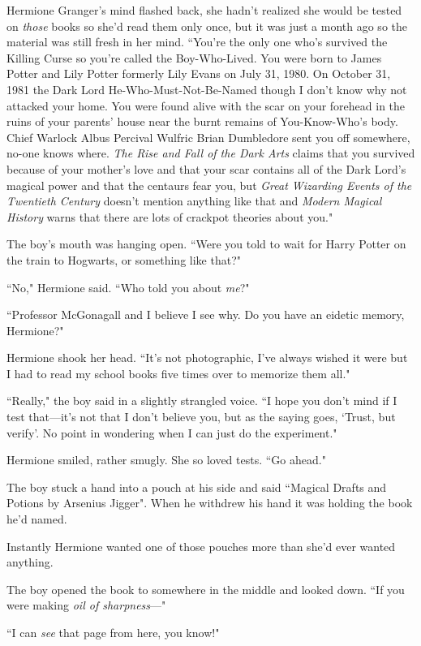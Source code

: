 Hermione Granger's mind flashed back, she hadn't realized she would be tested on \emph{those} books so she'd read them only once, but it was just a month ago so the material was still fresh in her mind. ``You're the only one who's survived the Killing Curse so you're called the Boy-Who-Lived. You were born to James Potter and Lily Potter formerly Lily Evans on July 31, 1980. On October 31, 1981 the Dark Lord He-Who-Must-Not-Be-Named though I don't know why not attacked your home. You were found alive with the scar on your forehead in the ruins of your parents' house near the burnt remains of You-Know-Who's body. Chief Warlock Albus Percival Wulfric Brian Dumbledore sent you off somewhere, no-one knows where. \emph{The Rise and Fall of the Dark Arts} claims that you survived because of your mother's love and that your scar contains all of the Dark Lord's magical power and that the centaurs fear you, but \emph{Great Wizarding Events of the Twentieth Century} doesn't mention anything like that and \emph{Modern Magical History} warns that there are lots of crackpot theories about you."

The boy's mouth was hanging open. ``Were you told to wait for Harry Potter on the train to Hogwarts, or something like that?"

``No," Hermione said. ``Who told you about \emph{me}?"

``Professor McGonagall and I believe I see why. Do you have an eidetic memory, Hermione?"

Hermione shook her head. ``It's not photographic, I've always wished it were but I had to read my school books five times over to memorize them all."

``Really," the boy said in a slightly strangled voice. ``I hope you don't mind if I test that—it's not that I don't believe you, but as the saying goes, `Trust, but verify'. No point in wondering when I can just do the experiment."

Hermione smiled, rather smugly. She so loved tests. ``Go ahead."

The boy stuck a hand into a pouch at his side and said ``Magical Drafts and Potions by Arsenius Jigger". When he withdrew his hand it was holding the book he'd named.

Instantly Hermione wanted one of those pouches more than she'd ever wanted anything.

The boy opened the book to somewhere in the middle and looked down. ``If you were making \emph{oil of sharpness}—"

``I can \emph{see} that page from here, you know!"

